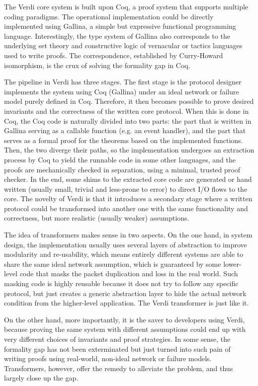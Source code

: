 \documentclass[twocolumn]{article}
\begin{document}
The Verdi core system is built upon Coq, a proof system that supports multiple
coding paradigms. The operational implementation could be directly implemented
using Gallina, a simple but expressive functional programming language.
Interestingly, the type system of Gallina also corresponds to the underlying
set theory and constructive logic of vernacular or tactics languages used to
write proofs. The correspondence, established by Curry-Howard isomorphism, is
the crux of solving the formality gap in Coq.

The pipeline in Verdi has three stages. The first stage is the protocol
designer implements the system using Coq (Gallina) under an ideal network or
failure model purely defined in Coq. Therefore, it then becomes possible to
prove desired invariants and the correctness of the written core protocol.
When this is done in Coq, the Coq code is naturally divided into two parts: the
part that is written in Gallina serving as a callable function (e.g. an event
handler), and the part that serves as a formal proof for the theorems
based on the implemented functions. Then, the two diverge their paths, so the
implementation undergoes an extraction process by Coq to yield the runnable
code in some other languages, and the proofs are mechanically checked in
separation, using a minimal, trusted proof checker. In the end, some shims to
the extracted core code are generated or hand written (usually small, trivial
and less-prone to error) to direct I/O flows to the core. The novelty of Verdi
is that it introduces a secondary stage where a written protocol could be
transformed into another one with the same functionality and correctness, but
more realistic (usually weaker) assumptions.

The idea of transformers makes sense in two aspects. On the one hand, in system
design, the implementation usually uses several layers of abstraction to
improve modularity and re-usability, which means entirely different systems
are able to share the same ideal network assumption, which is guaranteed by some
lower-level code that masks the packet duplication and loss in the real world.
Such masking code is highly reusable because it does not try to follow any
specific protocol, but just creates a generic abstraction layer to hide the
actual network condition from the higher-level application. The Verdi
transformer is just like it.

On the other hand,  more importantly, it is the saver to developers using
Verdi, because proving the same system with different assumptions could end up
with very different choices of invariants and proof strategies. In some sense,
the formality gap has not been exterminated but just turned into such pain of
writing proofs using real-world, non-ideal network or failure models.
Transformers, however, offer the remedy to alleviate the problem, and thus
largely close up the gap.
\end{document}
